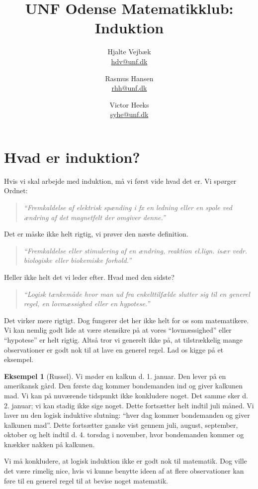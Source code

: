 \documentclass[a4paper, 12pt]{article}
\title{UNF Odense Matematikklub: Induktion}
\author{Hjalte Vejbæk\\ \href{mailto:hdv@unf.dk}{hdv@unf.dk}\and Rasmus Hansen\\ \href{mailto:rhh@unf.dk}{rhh@unf.dk}\and Victor Heeks\\ \href{mailto:syhe@unf.dk}{syhe@unf.dk}}
\date{}
\numberwithin{equation}{section}
\theoremstyle{plain}
\theoremstyle{definition}
\newtheorem{eksempel}[saetning]{Eksempel}
\begin{document}
\maketitle{}
\thispagestyle{empty}

\newpage
\setcounter{page}{1}
\section{Hvad er induktion?}
Hvis vi skal arbejde med induktion, må vi først vide hvad det er. Vi spørger Ordnet:
    \begin{quote}
        \textit{``Fremkaldelse af elektrisk spænding i fx en ledning eller en spole ved ændring af det magnetfelt der omgiver denne.''}
    \end{quote}
    Det er måske ikke helt rigtig, vi prøver den næste definition.
    \begin{quote}
        \textit{``Fremkaldelse eller stimulering af en ændring, reaktion el.lign. især vedr. biologiske eller biokemiske forhold.''}
    \end{quote}
    Heller ikke helt det vi leder efter. Hvad med den sidste?
    \begin{quote}
        \textit{``Logisk tænkemåde hvor man ud fra enkelttilfælde slutter sig til en generel regel, en lovmæssighed eller en hypotese.''}
    \end{quote}
    Det virker mere rigtigt. Dog fungerer det her ikke helt for os som matematikere. Vi kan nemlig godt lide at være stensikre på at vores ``lovmæssighed'' eller ``hypotese'' er helt rigtig. Altså tror vi generelt ikke på, at tilstrækkelig mange observationer er godt nok til at lave en generel regel. Lad os kigge på et eksempel.
    \begin{eksempel}[Russel]
        Vi møder en kalkun d. 1. januar. Den lever på en amerikansk gård. Den første dag kommer bondemanden ind og giver kalkunen mad. Vi kan på nuværende tidspunkt ikke konkludere noget. Det samme sker d. 2. januar; vi kan stadig ikke sige noget. Dette fortsætter helt indtil juli måned. Vi laver nu den logisk induktive slutning: ``hver dag kommer bondemanden og giver kalkunen mad''. Dette fortsætter ganske vist gennem juli, august, september, oktober og helt indtil d. 4. torsdag i november, hvor bondemanden kommer og knækker nakken på kalkunen.
    \end{eksempel}
    Vi må konkludere, at logisk induktion ikke er godt nok til matematik. Dog ville det være rimelig nice, hvis vi kunne benytte ideen af at flere observationer kan føre til en generel regel til at bevise noget matematik.
\end{document}
